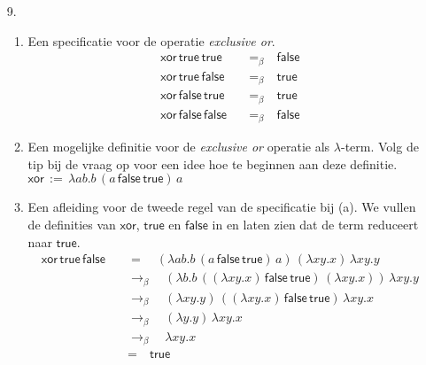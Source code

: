 \documentclass[a4paper,11pt]{article}
\begin{document}
\begin{enumerate}


\item[9.]

\begin{enumerate}

\item
Een specificatie voor de operatie \emph{exclusive or}.
\begin{align*}
  \textsf{xor} \, \textsf{true} \, \textsf{true} \quad & =_{\beta} \quad \textsf{false}\\
  \textsf{xor} \, \textsf{true} \, \textsf{false} \quad & =_{\beta} \quad \textsf{true}\\
  \textsf{xor} \, \textsf{false} \, \textsf{true} \quad & =_{\beta} \quad \textsf{true}\\
  \textsf{xor} \, \textsf{false} \, \textsf{false} \quad & =_{\beta} \quad \textsf{false}
\end{align*}

\item
Een mogelijke definitie voor de \emph{exclusive or} operatie als $\lambda$-term.
Volg de tip bij de vraag op voor een idee hoe te beginnen aan deze definitie.\\
$\textsf{xor} \, := \, \lambda a b. b \, (a \, \textsf{false} \, \textsf{true}) \, a$

\item
Een afleiding voor de tweede regel van de specificatie bij (a). We vullen de definities
van $\textsf{xor}$, $\textsf{true}$ en $\textsf{false}$ in en laten zien dat de term
reduceert naar $\textsf{true}$.
\begin{align*}
  \textsf{xor} \, \textsf{true} \, \textsf{false}
  & \quad = \quad
  (\lambda a b. b \, (a \, \textsf{false} \, \textsf{true}) \, a) \, (\lambda x y. x) \, \lambda x y. y\\
  & \quad \rightarrow_{\beta} \quad
  (\lambda b. b \, ((\lambda x y. x) \, \textsf{false} \, \textsf{true}) \, (\lambda x y. x)) \, \lambda x y. y\\
  & \quad \rightarrow_{\beta} \quad
  (\lambda x y. y) \, ((\lambda x y. x) \, \textsf{false} \, \textsf{true}) \, \lambda x y. x\\
  & \quad \rightarrow_{\beta} \quad
  (\lambda y. y) \, \lambda x y. x\\
  & \quad \rightarrow_{\beta} \quad
  \lambda x y. x\\
  & \quad = \quad
  \textsf{true}
\end{align*}

\end{enumerate}


\end{enumerate}
\end{document}
